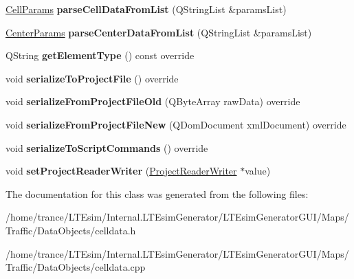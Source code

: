 \begin{DoxyCompactItemize}
\item 
\hyperlink{struct_cell_params}{Cell\+Params} {\bfseries parse\+Cell\+Data\+From\+List} (Q\+String\+List \&params\+List)\hypertarget{class_cell_data_aca2d037e20f6d87e064e0ceda28cc5d7}{}\label{class_cell_data_aca2d037e20f6d87e064e0ceda28cc5d7}

\item 
\hyperlink{struct_center_params}{Center\+Params} {\bfseries parse\+Center\+Data\+From\+List} (Q\+String\+List \&params\+List)\hypertarget{class_cell_data_af27b75e4cd0fd3112c9b698ee1e45102}{}\label{class_cell_data_af27b75e4cd0fd3112c9b698ee1e45102}

\item 
Q\+String {\bfseries get\+Element\+Type} () const override\hypertarget{class_cell_data_af5b091c26acbc45435a1cb6b509de4d8}{}\label{class_cell_data_af5b091c26acbc45435a1cb6b509de4d8}

\item 
void {\bfseries serialize\+To\+Project\+File} () override\hypertarget{class_cell_data_a4fdbf6bd16db6b0992a304c5d25b91aa}{}\label{class_cell_data_a4fdbf6bd16db6b0992a304c5d25b91aa}

\item 
void {\bfseries serialize\+From\+Project\+File\+Old} (Q\+Byte\+Array raw\+Data) override\hypertarget{class_cell_data_a673847f272bf60e91212f6006c04b5b9}{}\label{class_cell_data_a673847f272bf60e91212f6006c04b5b9}

\item 
void {\bfseries serialize\+From\+Project\+File\+New} (Q\+Dom\+Document xml\+Document) override\hypertarget{class_cell_data_acc97c849d8e379d9eedef17b87daee9b}{}\label{class_cell_data_acc97c849d8e379d9eedef17b87daee9b}

\item 
void {\bfseries serialize\+To\+Script\+Commands} () override\hypertarget{class_cell_data_aba1c0732bce225db352eee0eafe5869d}{}\label{class_cell_data_aba1c0732bce225db352eee0eafe5869d}

\item 
void {\bfseries set\+Project\+Reader\+Writer} (\hyperlink{class_project_reader_writer}{Project\+Reader\+Writer} $\ast$value)\hypertarget{class_cell_data_a0f726bb62ecc85b6ed83045149e49da8}{}\label{class_cell_data_a0f726bb62ecc85b6ed83045149e49da8}

\end{DoxyCompactItemize}


The documentation for this class was generated from the following files\+:\begin{DoxyCompactItemize}
\item 
/home/trance/\+L\+T\+Esim/\+Internal.\+L\+T\+Esim\+Generator/\+L\+T\+Esim\+Generator\+G\+U\+I/\+Maps/\+Traffic/\+Data\+Objects/celldata.\+h\item 
/home/trance/\+L\+T\+Esim/\+Internal.\+L\+T\+Esim\+Generator/\+L\+T\+Esim\+Generator\+G\+U\+I/\+Maps/\+Traffic/\+Data\+Objects/celldata.\+cpp\end{DoxyCompactItemize}

